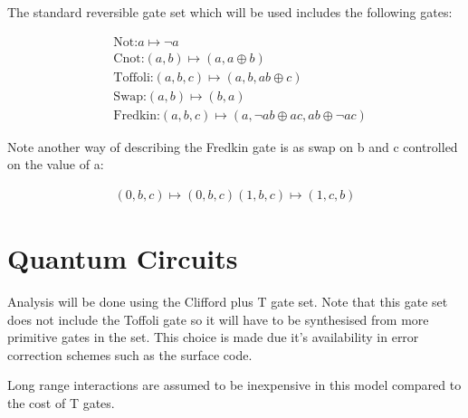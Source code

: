 The standard reversible gate set which will be used includes the following gates:

\begin{align*}
	&\text{Not:} a \mapsto \neg a \\
	&\text{Cnot:} (a,b) \mapsto (a,a\oplus b) \\
    &\text{Toffoli:} (a,b,c) \mapsto (a,b,ab\oplus c) \\
	&\text{Swap:} (a,b) \mapsto (b,a) \\
	&\text{Fredkin:} (a,b,c) \mapsto (a,\neg a b \oplus ac, ab\oplus \neg a c)
\end{align*}

Note another way of describing the Fredkin gate is as swap on b and c
controlled on the value of a:

\begin{align*}
    (0,b,c) \mapsto (0,b,c)
    (1,b,c) \mapsto (1,c,b)
\end{align*}


\section{Quantum Circuits}

Analysis will be done using the Clifford plus T gate set.  Note that this gate
set does not include the Toffoli gate so it will have to be synthesised from
more primitive gates in the set.  This choice is made due it's availability in
error correction schemes such as the surface code\cites{}.

Long range interactions are assumed to be inexpensive in this model compared to
the cost of T gates.

